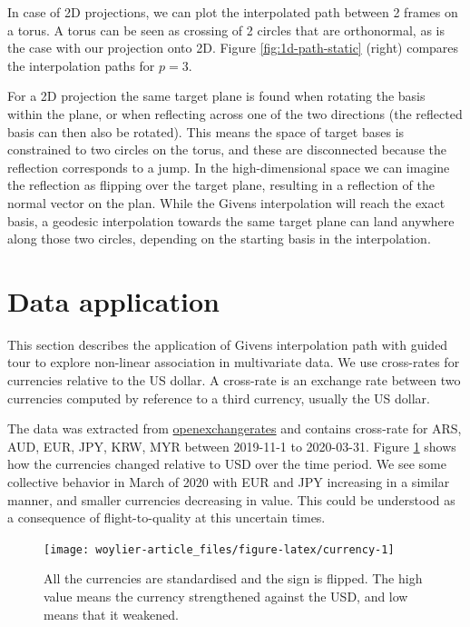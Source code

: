 In case of 2D projections, we can plot the interpolated path between 2
frames on a torus. A torus can be seen as crossing of 2 circles that are
orthonormal, as is the case with our projection onto 2D. Figure
\ref{fig:1d-path-static} (right) compares the interpolation paths for
\(p=3\).

For a 2D projection the same target plane is found when rotating the
basis within the plane, or when reflecting across one of the two
directions (the reflected basis can then also be rotated). This means
the space of target bases is constrained to two circles on the torus,
and these are disconnected because the reflection corresponds to a jump.
In the high-dimensional space we can imagine the reflection as flipping
over the target plane, resulting in a reflection of the normal vector on
the plan. While the Givens interpolation will reach the exact basis, a
geodesic interpolation towards the same target plane can land anywhere
along those two circles, depending on the starting basis in the
interpolation.

\hypertarget{data-application}{%
\section{Data application}\label{data-application}}

This section describes the application of Givens interpolation path with
guided tour to explore non-linear association in multivariate data. We
use cross-rates for currencies relative to the US dollar. A cross-rate
is an exchange rate between two currencies computed by reference to a
third currency, usually the US dollar.

The data was extracted from
\href{https://openexchangerates.org}{openexchangerates} and contains
cross-rate for ARS, AUD, EUR, JPY, KRW, MYR between 2019-11-1 to
2020-03-31. Figure \ref{fig:currency} shows how the currencies changed
relative to USD over the time period. We see some collective behavior in
March of 2020 with EUR and JPY increasing in a similar manner, and
smaller currencies decreasing in value. This could be understood as a
consequence of flight-to-quality at this uncertain times.

\begin{Schunk}
\begin{figure}
\texttt{[image: woylier-article\_files/figure-latex/currency-1]} \caption[All the currencies are standardised and the sign is flipped]{All the currencies are standardised and the sign is flipped. The high value means the currency strengthened against the USD, and low means that it weakened.}\label{fig:currency}
\end{figure}
\end{Schunk}

